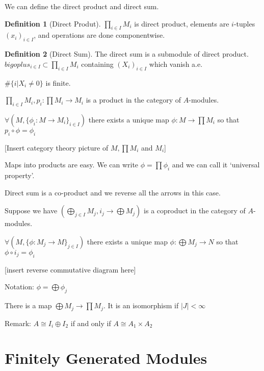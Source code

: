 \documentclass{article}
\theoremstyle{definition}
\newtheorem{definition}{Definition}
\begin{document}
We can define the direct product and direct sum.

\begin{definition}
    [Direct Produt]

    \(\prod_{i\in I} M_i\) is direct product, elements are \(i\)-tuples \((x_i)_{i\in I}\), and operations are done componentwise.
\end{definition}

\begin{definition}
    [Direct Sum]

    The direct sum is a submodule of direct product. \(bigoplus_{i\in I} \subset \prod_{i\in I}M_i\) containing \((X_i)_{i\in I}\) which vanish a.e.

    \(\#\{ i | X_i \neq 0 \}\) is finite.

\end{definition}

\(\prod_{i\in I}M_i, p_i : \prod M_i \to M_i\) is a product in the category of \(A\)-modules.

\(\forall ( M, \{ \phi_i : M \to M_i \}_{i\in I} ) \) there exists a unique map \(\phi : M \to \prod M_i\) so that \(p_i \circ \phi = \phi_i\)

[Insert category theory picture of \(M, \prod M_i\) and \(M_i\)]

Maps into products are easy. We can write \(\phi = \prod \phi_i\) and we can call it `universal property'.

Direct sum is a co-product and we reverse all the arrows in this case.

Suppose we have \((\bigoplus_{j\in I} M_j, i_j \to \bigoplus M_j)\) is a coproduct in the category of \(A\)-modules.

\(\forall (M, \{ \phi: M_j \to M \}_{j\in I})\) there exists a unique map \(\phi: \bigoplus M_j \to N\) so that \(\phi\circ i_j = \phi_i\) 

[insert reverse commutative diagram here]

Notation: \(\phi = \bigoplus \phi_j \) 

There is a map \(\bigoplus M_j \to \prod M_j \). It is an isomorphism if \(\vert J \vert < \infty\) 

Remark: \(A \cong I_i \oplus I_2\) if and only if \(A \cong A_1\times A_2\) 

\section*{Finitely Generated Modules}
\end{document}
